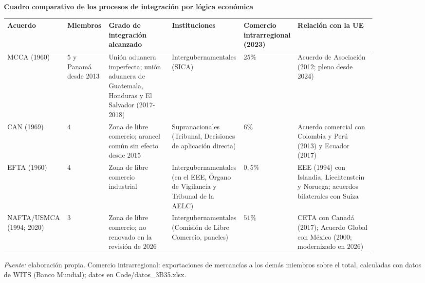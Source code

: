 \documentclass[10pt,a4paper]{article}
\begin{document}
\begin{center}
\textbf{Cuadro comparativo de los procesos de integración por lógica económica}\par\medskip
{\footnotesize\renewcommand{\arraystretch}{1.3}
\begin{tabular}{|p{0.13\linewidth}|p{0.11\linewidth}|p{0.17\linewidth}|p{0.17\linewidth}|p{0.09\linewidth}|p{0.21\linewidth}|}
\hline
\raggedright\textbf{Acuerdo} & \raggedright\textbf{Miembros} & \raggedright\textbf{Grado de integración alcanzado} & \raggedright\textbf{Instituciones} & \raggedright\textbf{Comercio intrarre\-gional (2023)} & \raggedright\textbf{Relación con la UE}\tabularnewline
\hline
\raggedright MCCA (1960) & \raggedright $5$ y Panamá desde 2013 & \raggedright Unión aduanera imperfecta; unión aduanera de Guatemala, Honduras y El Salvador (2017-2018) & \raggedright Intergubernamentales (SICA) & \raggedright $25\%$ & \raggedright Acuerdo de Asociación (2012; pleno desde 2024)\tabularnewline
\hline
\raggedright CAN (1969) & \raggedright $4$ & \raggedright Zona de libre comercio; arancel común sin efecto desde 2015 & \raggedright Supranacionales (Tribunal, Decisiones de aplicación directa) & \raggedright $6\%$ & \raggedright Acuerdo comercial con Colombia y Perú (2013) y Ecuador (2017)\tabularnewline
\hline
\raggedright EFTA (1960) & \raggedright $4$ & \raggedright Zona de libre comercio industrial & \raggedright Intergubernamentales (en el EEE, Órgano de Vigilancia y Tribunal de la AELC) & \raggedright $0,5\%$ & \raggedright EEE (1994) con Islandia, Liechtenstein y Noruega; acuerdos bilaterales con Suiza\tabularnewline
\hline
\raggedright NAFTA/USMCA (1994; 2020) & \raggedright $3$ & \raggedright Zona de libre comercio; no renovado en la revisión de 2026 & \raggedright Intergubernamentales (Comisión de Libre Comercio, paneles) & \raggedright $51\%$ & \raggedright CETA con Canadá (2017); Acuerdo Global con México (2000; modernizado en 2026)\tabularnewline
\hline
\end{tabular}}\par\smallskip
{\footnotesize\textit{Fuente:} elaboración propia. Comercio intrarregional: exportaciones de mercancías a los demás miembros sobre el total, calculadas con datos de WITS (Banco Mundial); datos en Code/datos\_3B35.xlsx.}
\end{center}
\end{document}
